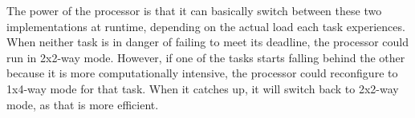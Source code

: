 The power of the \rvex{} processor is that it can basically switch between these 
two implementations at runtime, depending on the actual load each task 
experiences. When neither task is in danger of failing to meet its deadline, the 
\rvex{} processor could run in 2x2-way mode. However, if one of the tasks starts 
falling behind the other because it is more computationally intensive, the 
\rvex{} processor could reconfigure to 1x4-way mode for that task. When it 
catches up, it will switch back to 2x2-way mode, as that is more efficient.

